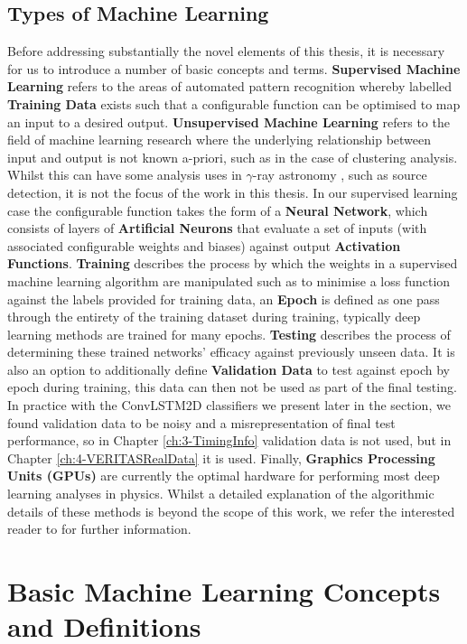 \subsection{Types of Machine Learning}
Before addressing substantially the novel elements of this thesis, it is necessary for us to introduce a number of basic 
concepts and terms. \textbf{Supervised Machine Learning} refers to the areas of automated pattern recognition whereby labelled \textbf{Training Data} exists such that a configurable function can be optimised to map an input to a desired output. \textbf{Unsupervised Machine Learning} refers to the field of machine learning research where the underlying relationship between input and output is not known a-priori, such as in the case of clustering analysis. Whilst this can have some analysis uses in $\gamma$-ray astronomy \cite{tomthesis}, such as source detection, it is not the focus of the work in this thesis. In our supervised learning case the configurable function takes the form of a \textbf{Neural Network}, which consists of layers of \textbf{Artificial Neurons} that evaluate a set of inputs (with associated configurable weights and biases) against output \textbf{Activation Functions}. \textbf{Training} describes the process by which the weights in a supervised machine learning algorithm are manipulated such as to minimise a loss function against the labels provided for training data, an \textbf{Epoch} is defined as one pass through the entirety of the training dataset during training, typically deep learning methods are trained for many epochs. \textbf{Testing} describes the process of determining these trained networks' efficacy against previously unseen data. It is also an option to additionally define \textbf{Validation Data} to test against epoch by epoch during training, this data can then not be used as part of the final testing. In practice with the ConvLSTM2D classifiers we present later in the section, we found validation data to be noisy and a misrepresentation of final test performance, so in Chapter \ref{ch:3-TimingInfo} validation data is not used, but in Chapter \ref{ch:4-VERITASRealData} it is used. Finally, \textbf{Graphics Processing Units (GPUs)} are currently the optimal hardware for performing most deep learning analyses in physics. Whilst a detailed explanation of the algorithmic details of these methods is beyond the scope of this work, we refer the interested reader to \cite{goodfellow2016deep} \cite{erdmannwhite} \cite{dcnn} for further information.

\section{Basic Machine Learning Concepts and Definitions}

